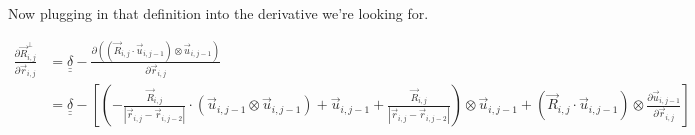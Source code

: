 \documentclass{article}
\renewcommand{\ij}{_{i,j}}
\newcommand{\ijj}{_{i,j-1}}
\newcommand{\ijjj}{_{i,j-2}}
\newcommand{\magn}[1]{\left\vert #1 \right\vert }
\renewcommand{\part}[2]{\frac{\partial #1 }{\partial #2}}
\newcommand{\ten}[1]{\underline{\underline{#1}}}
\newcommand{\rij}{\vec{r} \ij}
\newcommand{\Rij}{\vec{R} \ij}
\newcommand{\rijj}{\vec{r} \ijj}
\newcommand{\rijjj}{\vec{r} \ijjj}
\newcommand{\uijj}{\vec{u} \ijj}
\begin{document}

Now plugging in that definition into the derivative we're looking for.

\begin{align*}
  \part{\vec{R}\ij ^ \bot}{\vec{r}\ij}  &=  \ten{\delta} 
  - \part{\left(\left(\vec{R}\ij \cdot \vec{u} \ijj \right) \otimes 
  \vec{u} \ijj \right)
  }{\vec{r}\ij} \\
  &= 
  \ten{\delta} 
  -
  \left[
  \left(
  -\frac{\vec{R} \ij}{\magn{\rij - \rijjj}} \cdot (\uijj \otimes \uijj ) 
  +  \uijj
  +  \frac{\Rij}{\magn{\rij - \rijjj}}
  \right) \otimes \uijj
  +  
  \left(\vec{R}\ij \cdot \vec{u} \ijj \right)
  \otimes 
  {\part{\vec{u} \ijj }{\vec{r}\ij} }
  \right]
\end{align*}
 
\end{document}
